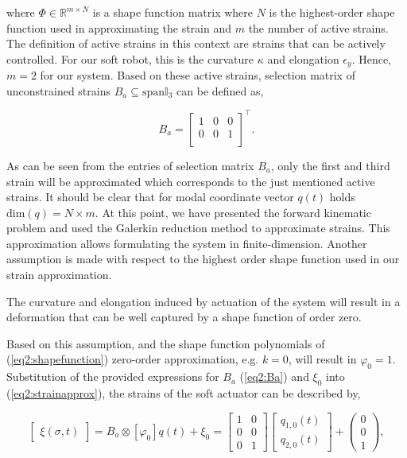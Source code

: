 where $\Phi \in \mathbb{R}^{m \times N}$ is a shape function matrix where $N$ is the highest-order shape function used in approximating the strain and $m$ the number of active strains. The definition of active strains in this context are strains that can be actively controlled. For our soft robot, this is the curvature $\kappa$ and elongation $\epsilon_y$. Hence, $m=2$ for our system. Based on these active strains, selection matrix of unconstrained strains $B_a \subseteq \text{span} \mathbb{I}_3$ can be defined as,

\begin{equation}
    B_a = \begin{bmatrix}
    1 & 0 & 0  \\
    0 & 0 & 1  \\
    \end{bmatrix}^\top.
    \label{eq2:Ba}
\end{equation}

As can be seen from the entries of selection matrix $B_a$, only the first and third strain will be approximated which corresponds to the just mentioned active strains. It should be clear that for modal coordinate vector $q(t)$ holds $\text{dim}(q) = N \times m $. At this point, we have presented the forward kinematic problem and used the Galerkin reduction method to approximate strains. This approximation allows formulating the system in finite-dimension. Another assumption is made with respect to the highest order shape function used in our strain approximation.

\begin{theorem}
The curvature and elongation induced by actuation of the system will result in a deformation that can be well captured by a shape function of order zero.
\end{theorem}

Based on this assumption, and the shape function polynomials of (\ref{eq2:shapefunction}) zero-order approximation, e.g. $k=0$, will result in $\varphi_0 = 1$. Substitution of the provided expressions for $B_a$ (\ref{eq2:Ba}) and $\xi_0$ into (\ref{eq2:strainapprox}), the strains of the soft actuator can be described by,


\begin{equation}
    \begin{bmatrix}\xi(\sigma,t)\end{bmatrix} =B_a \otimes [\varphi_0] q(t) + \xi_0  =  \begin{bmatrix}
    1 & 0  \\
    0 & 0  \\
    0 & 1
    \end{bmatrix} \begin{bmatrix} q_{1,0}(t) \\  q_{2,0}(t) \end{bmatrix} +  \begin{pmatrix} 0 \\ 0 \\ 1   \end{pmatrix},
\label{eq2:xishape}
\end{equation}

